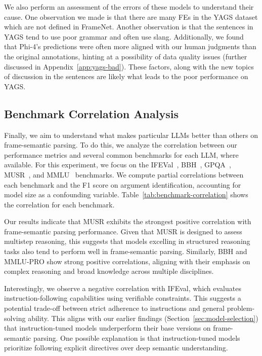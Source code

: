 We also perform an assessment of the errors of these models to understand their cause. One observation we made is that there are many FEs in the YAGS dataset which are not defined in FrameNet. Another observation is that the sentences in YAGS tend to use poor grammar and often use slang. Additionally, we found that Phi-4's predictions were often more aligned with our human judgments than the original annotations, hinting at a possibility of data quality issues (further discussed in Appendix~\ref{app:yags-bad}). These factors, along with the new topics of discussion in the sentences are likely what leads to the poor performance on YAGS. 


\subsection{Benchmark Correlation Analysis}
Finally, we aim to understand what makes particular LLMs better than others on frame-semantic parsing. To do this, we analyze the correlation between our performance metrics and several common benchmarks for each LLM, where available. For this experiment, we focus on the IFEVal~\cite{zhou2023instructionfollowingevaluationlargelanguage}, BBH~\cite{suzgun2022challengingbigbenchtaskschainofthought}, GPQA~\cite{rein2023gpqagraduatelevelgoogleproofqa}, MUSR~\cite{sprague2024musrtestinglimitschainofthought}, and MMLU~\cite{hendrycks2021measuringmassivemultitasklanguage} benchmarks. We compute partial correlations between each benchmark and the F1 score on argument identification, accounting for model size as a confounding variable. Table~\ref{tab:benchmark-correlation} shows the correlation for each benchmark.

Our results indicate that MUSR exhibits the strongest positive correlation with frame-semantic parsing performance. Given that MUSR is designed to assess multistep reasoning, this suggests that models excelling in structured reasoning tasks also tend to perform well in frame-semantic parsing. Similarly, BBH and MMLU-PRO show strong positive correlations, aligning with their emphasis on complex reasoning and broad knowledge across multiple disciplines.

Interestingly, we observe a negative correlation with IFEval, which evaluates instruction-following capabilities using verifiable constraints. This suggests a potential trade-off between strict adherence to instructions and general problem-solving ability. This aligns with our earlier findings (Section~\ref{sec:model-selection}) that instruction-tuned models underperform their base versions on frame-semantic parsing. One possible explanation is that instruction-tuned models prioritize following explicit directives over deep semantic understanding.

